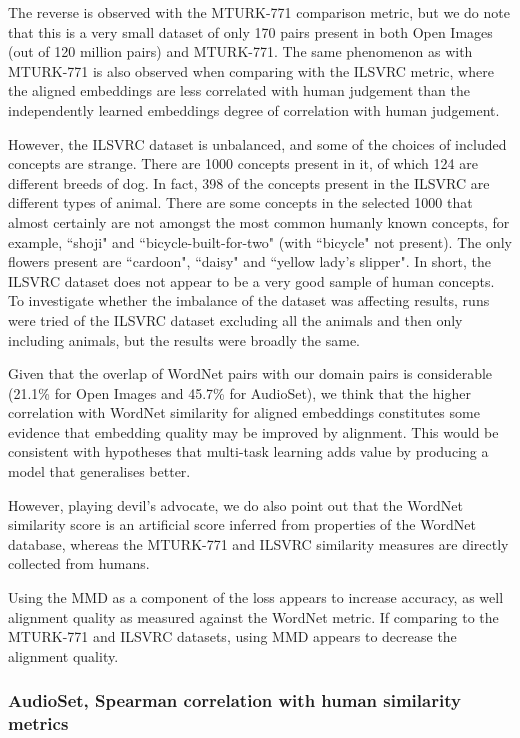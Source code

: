 The reverse is observed with the MTURK-771 comparison metric, but we do note that this is a very small dataset of only 170 pairs present in both Open Images (out of 120 million pairs) and MTURK-771. The same phenomenon as with MTURK-771 is also observed when comparing with the ILSVRC metric, where the aligned embeddings are less correlated with human judgement than the independently learned embeddings degree of correlation with human judgement. 

However, the ILSVRC dataset is unbalanced, and some of the choices of included concepts are strange. There are 1000 concepts present in it, of which 124 are different breeds of dog. In fact, 398 of the concepts present in the ILSVRC are different types of animal. There are some concepts in the selected 1000 that almost certainly are not amongst the most common humanly known concepts, for example, ``shoji" and ``bicycle-built-for-two" (with ``bicycle" not present). The only flowers present are ``cardoon", ``daisy" and ``yellow lady's slipper". In short, the ILSVRC dataset does not appear to be a very good sample of human concepts. To investigate whether the imbalance of the dataset was affecting results, runs were tried of the ILSVRC dataset excluding all the animals and then only including animals, but the results were broadly the same. 

Given that the overlap of WordNet pairs with our domain pairs is considerable (21.1\% for Open Images and 45.7\% for AudioSet), we think that the higher correlation with WordNet similarity for aligned embeddings constitutes some evidence that embedding quality may be improved by alignment. This would be consistent with hypotheses that multi-task learning adds value by producing a model that generalises better.

However, playing devil's advocate, we do also point out that the WordNet similarity score is an artificial score inferred from properties of the WordNet database, whereas the MTURK-771 and  ILSVRC similarity measures are directly collected from humans. 

Using the MMD as a component of the loss appears to increase accuracy, as well alignment quality as measured against the WordNet metric. If comparing to the MTURK-771 and ILSVRC datasets, using MMD appears to decrease the alignment quality.  

\subsubsection{AudioSet, Spearman correlation with human similarity metrics}

